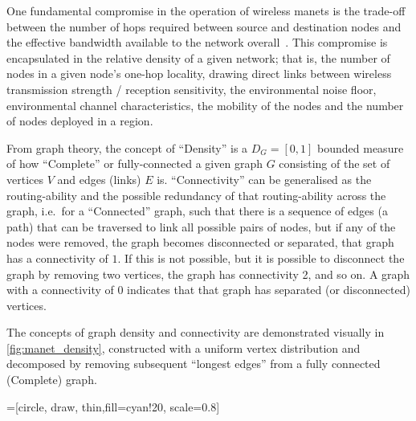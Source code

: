 One fundamental compromise in the operation of wireless \glspl{manet} is the trade-off between the number of hops required between source and destination nodes and the effective bandwidth available to the network overall~\cite{Royer2001}.
This compromise is encapsulated in the relative density of a given network; that is, the number of nodes in a given node's one-hop locality, drawing direct links between wireless transmission strength / reception sensitivity, the environmental noise floor, environmental channel characteristics, the mobility of the nodes and the number of nodes deployed in a region.

From graph theory, the concept of ``Density'' is a $D_G=[0,1]$ bounded measure of how ``Complete'' or fully-connected a given graph $G$ consisting of the set of vertices $V$ and edges (links) $E$ is.
``Connectivity'' can be generalised as the routing-ability and the possible redundancy of that routing-ability across the graph, i.e.\ for a ``Connected'' graph, such that there is a sequence of edges (a path) that can be traversed to link all possible pairs of nodes, but if any of the nodes were removed, the graph becomes disconnected or separated, that graph has a connectivity of $1$.
If this is not possible, but it is possible to disconnect the graph by removing two vertices, the graph has connectivity 2, and so on.
A graph with a connectivity of $0$ indicates that that graph has separated (or disconnected) vertices.

The concepts of graph density and connectivity are demonstrated visually in \autoref{fig:manet_density}, constructed with a uniform vertex distribution and decomposed by removing subsequent ``longest edges'' from a fully connected (Complete) graph.

=[circle, draw, thin,fill=cyan!20, scale=0.8]

